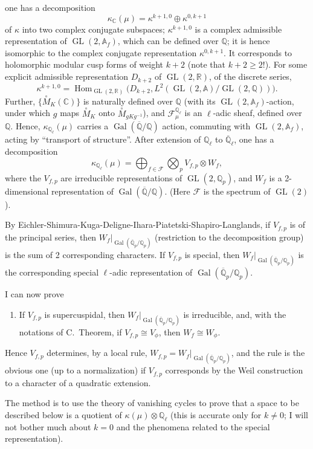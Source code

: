 \documentclass[11pt,a4paper]{article}
\theoremstyle{plain}
\theoremstyle{definition}
\theoremstyle{remark}
\DeclareMathOperator{\Hom}{Hom}
\DeclareMathOperator{\Gal}{Gal}
\DeclareMathOperator{\GL}{GL}
\newcommand{\C}{\mathbb{C}}
\newcommand{\Q}{\mathbb{Q}}
\newcommand{\R}{\mathbb{R}}
\newcommand{\Af}{\mathbb{A}_{f}}
\newcommand{\Qpbar}{\overline{\mathbb{Q}}_{p}}
\newcommand{\Qp}{\mathbb{Q}_{p}}
\newcommand{\Ql}{\mathbb{Q}_{\ell}}
\newcommand{\Qlbar}{\overline{\mathbb{Q}}_{\ell}}
\begin{document}
one has a decomposition
\[
\kappa_{\C}(\mu) = \kappa^{k+1,0} \oplus \kappa^{0,k+1}
\]
of $\kappa$ into two complex conjugate subspaces; $\kappa^{k+1,0}$ is a complex admissible representation of $\GL(2, \Af)$, which can be defined over $\Q$; it is hence isomorphic to the complex conjugate representation $\kappa^{0,k+1}$. It corresponds to holomorphic modular cusp forms of weight $k+2$ (note that $k+2 \geq 2$!). For some explicit admissible representation $D_{k+2}$ of $\GL(2, \R)$, of the discrete series,
\[
\kappa^{k+1,0} = \Hom_{\GL(2, \R)}\bigl(D_{k+2}, L^{2}(\GL(2, \mathbb{A})/\GL(2, \Q))\bigr).
\]
Further, $\{\overset{\circ}{M}_{K}(\C)\}$ is naturally defined over $\Q$ (with its $\GL(2, \Af)$-action, under which $g$ maps $\overset{\circ}{M}_{K}$ onto $\overset{\circ}{M}_{gKg^{-1}}$), and $\mathcal{F}_{\mu}^{\Ql}$ is an $\ell$-adic sheaf, defined over $\Q$. Hence, $\kappa_{\Ql}(\mu)$ carries a $\Gal(\overline{\Q}/\Q)$ action, commuting with $\GL(2, \Af)$, acting by ``transport of structure''. After extension of $\Ql$ to $\Qlbar$, one has a decomposition
\[
\kappa_{\Ql}(\mu) = \bigoplus_{f \in \mathcal{F}} \bigotimes_{p} V_{f,p} \otimes W_{f},
\]
where the $V_{f,p}$ are irreducible representations of $\GL(2, \Qp)$, and $W_{f}$ is a 2-dimensional representation of $\Gal(\overline{\Q}/\Q)$. (Here $\mathcal{F}$ is the spectrum of $\GL(2)$).

By Eichler-Shimura-Kuga-Deligne-Ihara-Piatetski-Shapiro-Langlands, if $V_{f,p}$ is of the principal series, then $W_{f}\big|_{\Gal(\Qpbar/\Qp)}$ (restriction to the decomposition group) is the sum of 2 corresponding characters. If $V_{f,p}$ is special, then $W_{f}\big|_{\Gal(\Qpbar/\Qp)}$ is the corresponding special $\ell$-adic representation of $\Gal(\Qpbar/\Qp)$.

I can now prove

\begin{enumerate}
\item[(A).] If $V_{f,p}$ is supercuspidal, then $W_{f}\big|_{\Gal(\Qpbar/\Qp)}$ is irreducible, and, with the notations of C.\ Theorem, if $V_{f,p} \cong V_{\phi}$, then $W_{f} \cong W_{\phi}$.
\end{enumerate}

Hence $V_{f,p}$ determines, by a local rule, $W_{f,p} = W_{f}\big|_{\Gal(\Qpbar/\Qp)}$, and the rule is the obvious one (up to a normalization) if $V_{f,p}$ corresponds by the Weil construction to a character of a quadratic extension.

The method is to use the theory of vanishing cycles to prove that a space to be described below is a quotient of $\kappa(\mu) \otimes \Ql$ (this is accurate only for $k \neq 0$; I will not bother much about $k = 0$ and the phenomena related to the special representation).
\end{document}
